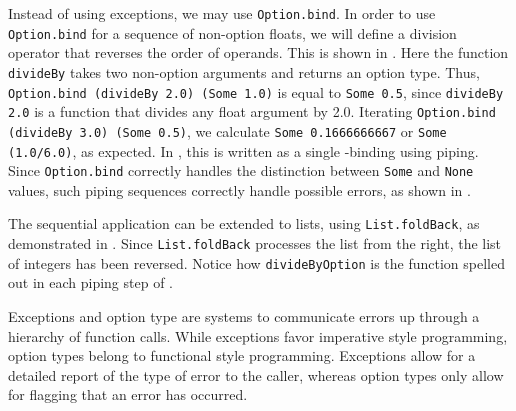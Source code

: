 \documentclass[fsharpNotes.tex]{subfiles}
\begin{document}
Instead of using exceptions, we may use \lstinline{Option.bind}. In order to use \lstinline{Option.bind} for a sequence of non-option floats, we will define a division operator that reverses the order of operands. This is shown in .
%
%
Here the function \lstinline{divideBy} takes two non-option arguments and returns an option type. Thus, \lstinline{Option.bind (divideBy 2.0) (Some 1.0)} is equal to \lstinline{Some 0.5}, since \lstinline{divideBy 2.0} is a function that divides any float argument by 2.0. Iterating \lstinline{Option.bind (divideBy 3.0) (Some 0.5)}, we calculate \lstinline{Some 0.1666666667} or \lstinline{Some (1.0/6.0)}, as expected. In , this is written as a single -binding using piping. Since \lstinline{Option.bind} correctly handles the distinction between \lstinline{Some} and \lstinline{None} values, such piping sequences correctly handle possible errors, as shown in .

The sequential application can be extended to lists, using \lstinline{List.foldBack}, as demonstrated in .
%
%
Since \lstinline{List.foldBack} processes the list from the right, the list of integers has been reversed. Notice how \lstinline{divideByOption} is the function spelled out in each piping step of .

Exceptions and option type are systems to communicate errors up through a hierarchy of function calls. While exceptions favor imperative style programming, option types belong to functional style programming. Exceptions allow for a detailed report of the type of error to the caller, whereas option types only allow for flagging that an error has occurred.

\begin{comment}
  \begin{itemize}
  \item exn type Spec-4.0 Chapter 18.1
  \item Spec-4.0 Section 18.2.
  \item Husk, som if-else skal try-with branches være af samme type. Giv eksempel på parsning af argument til selvdefineret exception. Gå problem med divmed0exception igennem: 3 cases, failsafe værdier, undtagelser, eller option typer.
  \item Extend railway paradigm, \url{https://fsharpforfunandprofit.com/posts/computation-expressions-bind/}
  \item Extend notion of exception heriarchy and relation to catching or not.
  \end{itemize}
\end{comment}
\end{document}
